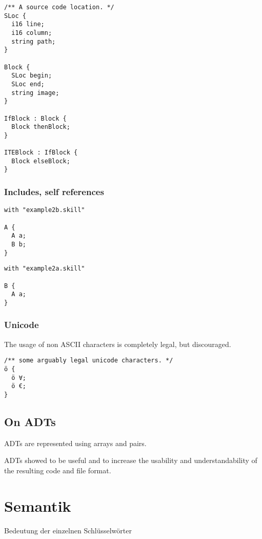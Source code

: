 \documentclass[a4paper,10pt]{article}
\begin{document}
\begin{lstlisting}[label=blockExample,caption=Running Example,language=skill]
/** A source code location. */
SLoc {
  i16 line;
  i16 column;
  string path;
}

Block {
  SLoc begin;
  SLoc end;
  string image;
}

IfBlock : Block {
  Block thenBlock;
}

ITEBlock : IfBlock {
  Block elseBlock;
}
\end{lstlisting}

\subsubsection*{Includes, self references}

\begin{lstlisting}[label=example2a,caption=Example 2a,language=skill]
with "example2b.skill"

A {
  A a;
  B b;
}
\end{lstlisting}

\begin{lstlisting}[label=example2b,caption=Example 2b,language=skill]
with "example2a.skill"

B {
  A a;
}
\end{lstlisting}

\subsubsection*{Unicode}
The usage of non ASCII characters is completely legal, but discouraged.
\begin{lstlisting}[label=unicode,caption=Unicode Support,language=skill]
/** some arguably legal unicode characters. */
ö {
  ö ∀;
  ö €;
}
\end{lstlisting}


\subsection{On ADTs}

ADTs are represented using arrays and pairs.

ADTs showed to be useful and to increase the usability and understandability of the resulting code and file format.

\section{Semantik}

Bedeutung der einzelnen Schlüsselwörter
\end{document}
